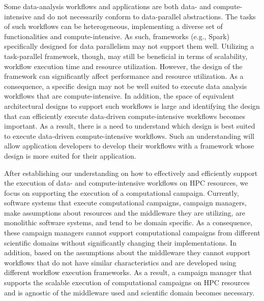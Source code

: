 Some data-analysis workflows and applications are both data- and 
compute-intensive and do not necessarily conform to data-parallel abstractions. 
The tasks of such workflows can be heterogeneous, implementing a diverse set of 
functionalities and compute-intensive. As such, frameworks (e.g., Spark) 
specifically designed for data parallelism may not support them well. Utilizing 
a task-parallel framework, though, may still be beneficial in terms of 
scalability, workflow execution time and resource utilization. However, the 
design of the framework can significantly affect performance and resource 
utilization. As a consequence, a specific design may not be well suited to 
execute data analysis workflows that are compute-intensive. In addition, the 
space of equivalent architectural designs to support such workflows is large 
and identifying the design that can efficiently execute data-driven 
compute-intensive workflows becomes important. As a result, there is a need to 
understand which design is best suited to execute data-driven compute-intensive 
workflows. Such an understanding will allow application developers to develop 
their workflows with a framework whose design is more suited for their 
application.

After establishing our understanding on how to effectively and efficiently 
support the execution of data- and compute-intensive workflows on HPC 
resources, we focus on supporting the execution of a computational campaign.
Currently, software systems that execute computational campaigns, campaign 
managers, make assumptions about resources and the middleware they are 
utilizing, are monolithic software systems, and tend to be domain specific. As 
a consequence, these campaign managers cannot support computational campaigns 
from different scientific domains without significantly changing their 
implementations. In addition, based on the assumptions about the middleware 
they cannot support workflows that do not have similar characteristics and are 
developed using different workflow execution frameworks. As a result, a 
campaign manager that supports the scalable execution of computational 
campaigns on HPC resources and is agnostic of the middleware used and 
scientific domain becomes necessary.

